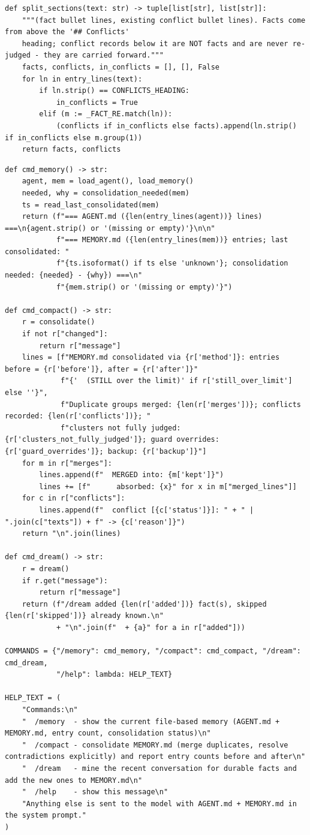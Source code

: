 \documentclass[11pt]{article}
\begin{document}
\begin{lstlisting}
def split_sections(text: str) -> tuple[list[str], list[str]]:
    """(fact bullet lines, existing conflict bullet lines). Facts come from above the '## Conflicts'
    heading; conflict records below it are NOT facts and are never re-judged - they are carried forward."""
    facts, conflicts, in_conflicts = [], [], False
    for ln in entry_lines(text):
        if ln.strip() == CONFLICTS_HEADING:
            in_conflicts = True
        elif (m := _FACT_RE.match(ln)):
            (conflicts if in_conflicts else facts).append(ln.strip() if in_conflicts else m.group(1))
    return facts, conflicts
\end{lstlisting}
\endgroup
\begingroup\lstset{basicstyle=\ttfamily\scriptsize}
\begin{lstlisting}
def cmd_memory() -> str:
    agent, mem = load_agent(), load_memory()
    needed, why = consolidation_needed(mem)
    ts = read_last_consolidated(mem)
    return (f"=== AGENT.md ({len(entry_lines(agent))} lines) ===\n{agent.strip() or '(missing or empty)'}\n\n"
            f"=== MEMORY.md ({len(entry_lines(mem))} entries; last consolidated: "
            f"{ts.isoformat() if ts else 'unknown'}; consolidation needed: {needed} - {why}) ===\n"
            f"{mem.strip() or '(missing or empty)'}")

def cmd_compact() -> str:
    r = consolidate()
    if not r["changed"]:
        return r["message"]
    lines = [f"MEMORY.md consolidated via {r['method']}: entries before = {r['before']}, after = {r['after']}"
             f"{'  (STILL over the limit)' if r['still_over_limit'] else ''}",
             f"Duplicate groups merged: {len(r['merges'])}; conflicts recorded: {len(r['conflicts'])}; "
             f"clusters not fully judged: {r['clusters_not_fully_judged']}; guard overrides: {r['guard_overrides']}; backup: {r['backup']}"]
    for m in r["merges"]:
        lines.append(f"  MERGED into: {m['kept']}")
        lines += [f"      absorbed: {x}" for x in m["merged_lines"]]
    for c in r["conflicts"]:
        lines.append(f"  conflict [{c['status']}]: " + " | ".join(c["texts"]) + f" -> {c['reason']}")
    return "\n".join(lines)

def cmd_dream() -> str:
    r = dream()
    if r.get("message"):
        return r["message"]
    return (f"/dream added {len(r['added'])} fact(s), skipped {len(r['skipped'])} already known.\n"
            + "\n".join(f"  + {a}" for a in r["added"]))

COMMANDS = {"/memory": cmd_memory, "/compact": cmd_compact, "/dream": cmd_dream,
            "/help": lambda: HELP_TEXT}

HELP_TEXT = (
    "Commands:\n"
    "  /memory  - show the current file-based memory (AGENT.md + MEMORY.md, entry count, consolidation status)\n"
    "  /compact - consolidate MEMORY.md (merge duplicates, resolve contradictions explicitly) and report entry counts before and after\n"
    "  /dream   - mine the recent conversation for durable facts and add the new ones to MEMORY.md\n"
    "  /help    - show this message\n"
    "Anything else is sent to the model with AGENT.md + MEMORY.md in the system prompt."
)
\end{lstlisting}
\end{document}
